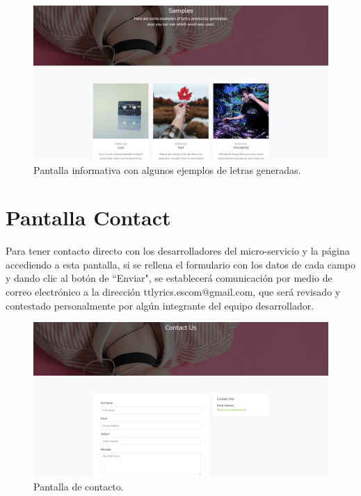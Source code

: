 \documentclass[12pt, a4paper, titlepage]{article}
\begin{document}
		\begin{figure}[H] 
			\includegraphics[width=13.5cm]{./Imagenes/Capturas/psamples.png}
			\centering \caption{Pantalla informativa con algunos ejemplos de letras generadas.}
		\end{figure}
	
		\section{Pantalla Contact}
		Para tener contacto directo con los desarrolladores del micro-servicio y la página accediendo a esta pantalla, si se rellena el formulario con los datos de cada campo y dando clic al botón de “Enviar", se establecerá comunicación por medio de correo electrónico a la dirección ttlyrics.escom@gmail.com, que será revisado y contestado personalmente por algún integrante del equipo desarrollador.
		
		\begin{figure}[H] 
			\includegraphics[width=13.5cm]{./Imagenes/Capturas/pcontact.png}
			\centering \caption{Pantalla de contacto.}
		\end{figure}
		
\end{document}
